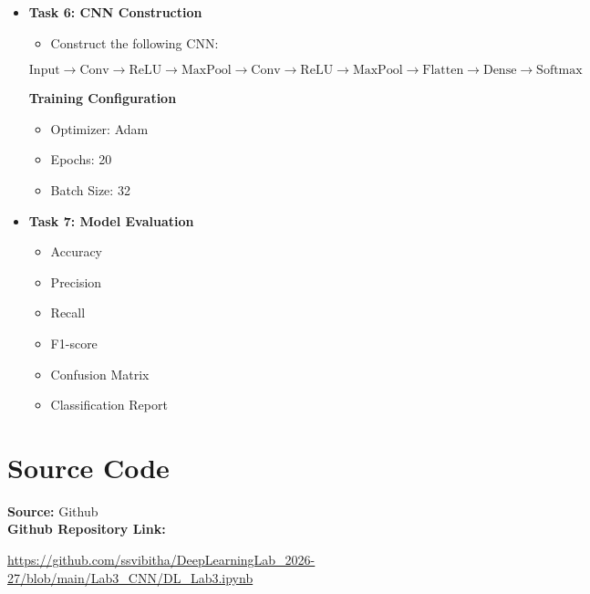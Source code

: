 \documentclass[11pt]{article}
\begin{document}
\begin{itemize}
    \item \textbf{Task 6: CNN Construction}
    \begin{itemize}
        \item Construct the following CNN:
    \end{itemize}
    \[
    \text{Input} \rightarrow \text{Conv} \rightarrow \text{ReLU}
    \rightarrow \text{MaxPool} \rightarrow \text{Conv}
    \rightarrow \text{ReLU} \rightarrow \text{MaxPool}
    \rightarrow \text{Flatten} \rightarrow \text{Dense}
    \rightarrow \text{Softmax}
    \]

    \textbf{Training Configuration}
    \begin{itemize}
        \item Optimizer: Adam
        \item Epochs: 20
        \item Batch Size: 32
    \end{itemize}

    \item \textbf{Task 7: Model Evaluation}
    \begin{itemize}
        \item Accuracy
        \item Precision
        \item Recall
        \item F1-score
        \item Confusion Matrix
        \item Classification Report
    \end{itemize}
\end{itemize}

\section{Source Code}
\noindent\textbf{Source:} Github\\
\noindent\textbf{Github Repository Link:}

\url{https://github.com/ssvibitha/DeepLearningLab_2026-27/blob/main/Lab3_CNN/DL_Lab3.ipynb}
\end{document}
